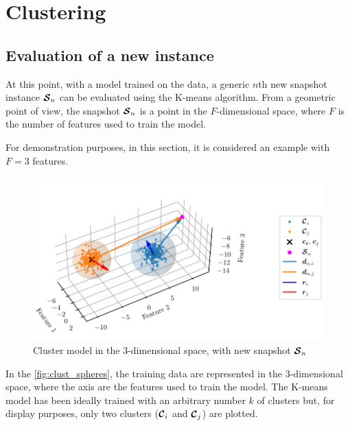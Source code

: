 \chapter{Clustering}

\section{Evaluation of a new instance}

At this point, with a model trained on the data, a generic $n$th new snapshot instance $\bm{\mathcal{S}}_n$ can be evaluated using the K-means algorithm.
From a geometric point of view, the snapshot $\bm{\mathcal{S}}_n$ is a point in the ${F}$-dimensional space, where ${F}$ is the number of features used to train the model.

For demonstration purposes, in this section, it is considered an example with ${F}=3$ features.

\begin{figure}[htbp]
  \centering
  \includegraphics[width=\textwidth]{images/Spheres_2.pdf}
\caption{Cluster model in the $3$-dimensional space, with new snapshot $\bm{\mathcal{S}}_n$}
\label{fig:clust_spheres}
\end{figure}

In the \autoref{fig:clust_spheres}, the training data are represented in the $3$-dimensional space, where the axis are the features used to train the model. The K-means model has been ideally trained with an arbitrary number $k$ of clusters but, for display purposes, only two clusters  ($\bm{\mathcal{C}}_i$ and $\bm{\mathcal{C}}_j$) are plotted. 
